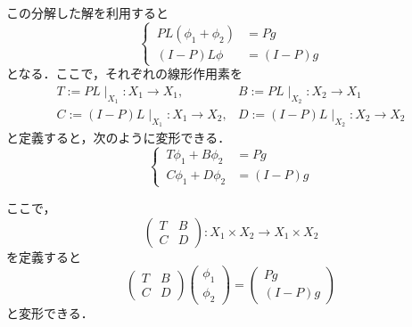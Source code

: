 \documentclass[11pt,a4paper,titlepage]{jsreport}
\theoremstyle{definition}
\begin{document}
  この分解した解を利用すると
  \begin{equation*}
    \left\{ \,
    \begin{aligned}
      PL(\phi_1+\phi_2) &= Pg \\
      (I-P)L\phi &= (I-P)g
    \end{aligned}
    \right.
  \end{equation*}
  となる．ここで，それぞれの線形作用素を
  \begin{equation*}
    \begin{array}{ll}
      T:=PL \mid_{X_1} : X_1 \rightarrow X_1, & B:=PL \mid_{X_2} : X_2 \rightarrow X_1 \\
      C:=(I-P)L \mid_{X_1} : X_1 \rightarrow X_2, & D:=(I-P)L \mid_{X_2} : X_2 \rightarrow X_2
   \end{array}
  \end{equation*}
  と定義すると，次のように変形できる．
  \begin{equation*}
    \left\{ \,
    \begin{aligned}
      T\phi_1+B\phi_2 &= Pg \\
      C\phi_1+D\phi_2 &= (I-P)g
    \end{aligned}
    \right.
  \end{equation*}

  ここで，
  \begin{equation*}
    \left(
    \begin{array}{cc}
      T & B \\
      C & D
    \end{array}
    \right)
    :X_1 \times X_2 \rightarrow  X_1 \times X_2
  \end{equation*}
  を定義すると
  \begin{equation*}
    \left(
    \begin{array}{cc}
      T & B \\
      C & D
    \end{array}
    \right)
    \begin{pmatrix}
      \phi_1 \\
      \phi_2
    \end{pmatrix}
    =
    \begin{pmatrix}
      Pg \\
      (I-P)g
    \end{pmatrix}
  \end{equation*}
  と変形できる．
\end{document}
